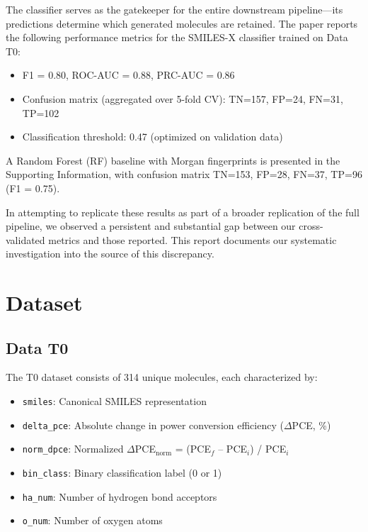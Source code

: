 \documentclass[11pt,a4paper]{article}
\begin{document}
The classifier serves as the gatekeeper for the entire downstream pipeline---its predictions determine which generated molecules are retained. The paper reports the following performance metrics for the SMILES-X classifier trained on Data T0:
\begin{itemize}[nosep]
    \item F1 = 0.80, ROC-AUC = 0.88, PRC-AUC = 0.86
    \item Confusion matrix (aggregated over 5-fold CV): TN=157, FP=24, FN=31, TP=102
    \item Classification threshold: 0.47 (optimized on validation data)
\end{itemize}

A Random Forest (RF) baseline with Morgan fingerprints is presented in the Supporting Information, with confusion matrix TN=153, FP=28, FN=37, TP=96 (F1 = 0.75).

In attempting to replicate these results as part of a broader replication of the full pipeline, we observed a persistent and substantial gap between our cross-validated metrics and those reported. This report documents our systematic investigation into the source of this discrepancy.

\section{Dataset}

\subsection{Data T0}

The T0 dataset consists of 314 unique molecules, each characterized by:
\begin{itemize}[nosep]
    \item \texttt{smiles}: Canonical SMILES representation
    \item \texttt{delta\_pce}: Absolute change in power conversion efficiency ($\Delta$PCE, \%)
    \item \texttt{norm\_dpce}: Normalized $\Delta$PCE$_{\text{norm}}$ = (PCE$_f$ -- PCE$_i$) / PCE$_i$
    \item \texttt{bin\_class}: Binary classification label (0 or 1)
    \item \texttt{ha\_num}: Number of hydrogen bond acceptors
    \item \texttt{o\_num}: Number of oxygen atoms
\end{itemize}
\end{document}
